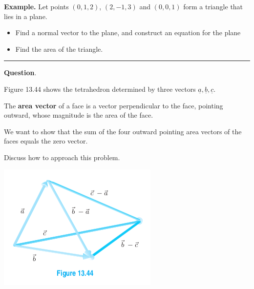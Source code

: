 \documentclass[12pt,letterpaper,noanswers]{exam}
\newcommand{\mb}[1]{\underline{#1}}
\begin{document}
\noindent\textbf{Example.} Let points $(0,1,2)$, $(2,-1,3)$ and $(0,0,1)$ form a triangle that lies in a plane.
\begin{itemize}
    \item Find a normal vector to the plane, and construct an equation for the plane
    \vspace{1.5in}
    
    \item Find the area of the triangle. 
    \vspace{0.5in}
\end{itemize}





\vspace{0.2cm}
\hrule
\vspace{0.2cm}



\noindent\textbf{Question}.

Figure 13.44 shows the tetrahedron determined by three vectors $\mb{a}, \mb{b}, \mb{c}$.

\begin{tcolorbox}
The \textbf{area vector} of a face is a vector perpendicular to the face, pointing outward, whose magnitude is the area of the face. 
\end{tcolorbox}

We want to show that the sum of the four outward pointing area vectors of the faces equals the zero vector.  

\noindent Discuss how to approach this problem.

\includegraphics[scale=0.4]{img/C05tetrahedron.png}
\end{document}
